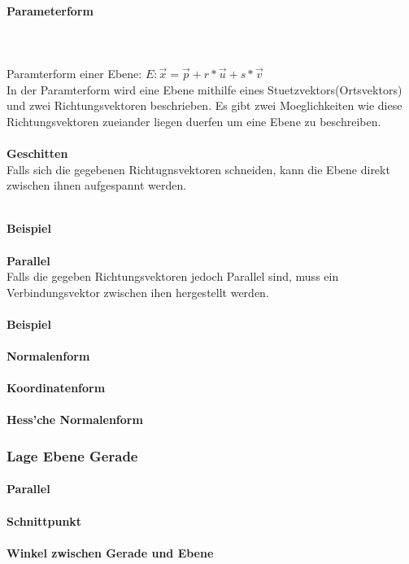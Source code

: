 \documentclass[a4paper]{article} %
\begin{document}
	\paragraph{Parameterform}
		\hspace{0 cm} \\ \noindent \\
	Paramterform einer Ebene: $E : \vec{x} = \vec{p}+ r*\vec{u}+s*\vec{v}$\\
	In der Paramterform wird eine Ebene mithilfe eines Stuetzvektors(Ortsvektors) und zwei Richtungsvektoren beschrieben.
	Es gibt zwei Moeglichkeiten wie diese Richtungsvektoren zueiander liegen duerfen um eine Ebene zu beschreiben.
	\\\textbf{\\Geschitten}\\
	Falls sich die gegebenen Richtugnsvektoren schneiden, kann die Ebene direkt zwischen ihnen aufgespannt werden.
	
	\textbf{\\Beispiel}
	\\\textbf{\\Parallel}\\
	Falls die gegeben Richtungsvektoren jedoch Parallel sind, muss ein Verbindungsvektor zwischen ihen hergestellt werden.
	\\\textbf{\\Beispiel}
	\paragraph{Normalenform}
	\paragraph{Koordinatenform}
	\paragraph{Hess'che Normalenform}
	\subsubsection{Lage Ebene Gerade}
	\paragraph{Parallel}
	\paragraph{Schnittpunkt}
	\paragraph{Winkel zwischen Gerade und Ebene}
\end{document}

